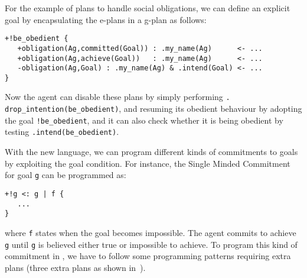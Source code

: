   For the example of plans to handle social obligations, we can define
  an explicit goal by encapsulating the e-plans in a g-plan as
  follows:
\begin{small}
\begin{verbatim}
+!be_obedient {
   +obligation(Ag,committed(Goal)) : .my_name(Ag)      <- ...
   +obligation(Ag,achieve(Goal))   : .my_name(Ag)      <- ...
   -obligation(Ag,Goal) : .my_name(Ag) & .intend(Goal) <- ...
}
\end{verbatim}
\end{small}
\noindent Now the agent can disable these plans by simply performing
\texttt{. drop\_intention(be\_obedient)}, and resuming its obedient
behaviour by adopting the goal \texttt{!be\_obedient}, and it can also
check whether it is being obedient by testing
\texttt{.intend(be\_obedient)}.

With the new language, we can program different kinds of commitments
to goals~\cite{cohen:90,winikoff:02} by exploiting the goal
condition. For instance, the Single Minded Commitment for goal
\texttt{g} can be programmed as:
\begin{small}
\begin{verbatim}
+!g <: g | f {
   ...
}
\end{verbatim}
\end{small}
where \texttt{f} states when the goal becomes impossible. The agent
commits to achieve \texttt{g} until \texttt{g} is believed either true
or impossible to achieve. To program this kind of commitment in \asl,
we have to follow some programming patterns requiring extra plans
(three extra plans as shown in~\cite{hubner:06b}).




